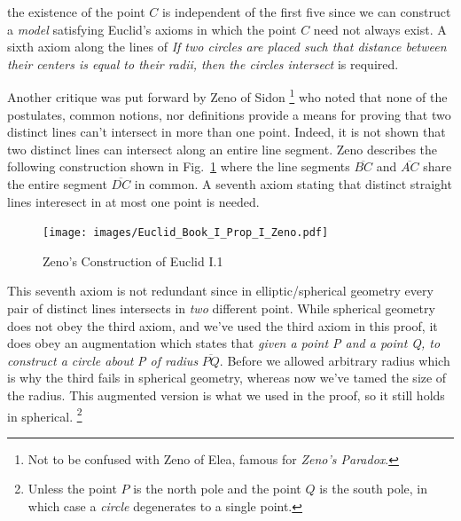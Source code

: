         the existence of the point $C$ is independent of the first five since
        we can construct a \textit{model} satisfying Euclid's axioms in which
        the point $C$ need not always exist. A sixth axiom along the lines of
        \textit{If two circles are placed such that distance between their}
        \textit{centers is equal to their radii, then the circles intersect} is
        required.
        \par\hfill\par
        Another critique was put forward by Zeno of Sidon%
        \footnote{%
            Not to be confused with Zeno of Elea, famous for
            \textit{Zeno's Paradox}.
        }
        who noted that none of the postulates, common notions, nor definitions
        provide a means for proving that two distinct lines can't intersect in
        more than one point. Indeed, it is not shown that two distinct lines can
        intersect along an entire line segment. Zeno describes the following
        construction shown in Fig.~\ref{fig:Zeno_Euclid_I_1} where the line
        segments $\overline{BC}$ and $\overline{AC}$ share the entire segment
        $\overline{DC}$ in common. A seventh axiom stating that distinct
        straight lines interesect in at most one point is needed.%
        \begin{figure}[H]
            \centering
            \captionsetup{type=figure}
            \texttt{[image: images/Euclid\_Book\_I\_Prop\_I\_Zeno.pdf]}
            \caption{Zeno's Construction of Euclid I.1}
            \label{fig:Zeno_Euclid_I_1}
        \end{figure}
        This seventh axiom is not redundant since in elliptic/spherical geometry
        every pair of distinct lines intersects in \textit{two} different point.
        While spherical geometry does not obey the third axiom, and we've used
        the third axiom in this proof, it does obey an augmentation which states
        that \textit{given a point P and a point Q, to construct a circle about}
        \textit{P of radius} $\overline{PQ}$. Before we allowed arbitrary radius
        which is why the third fails in spherical geometry, whereas now we've
        tamed the size of the radius. This augmented version is what we used in
        the proof, so it still holds in spherical.%
        \footnote{%
            Unless the point $P$ is the north pole and the point $Q$ is the
            south pole, in which case a \textit{circle} degenerates to a single
            point.
        }
